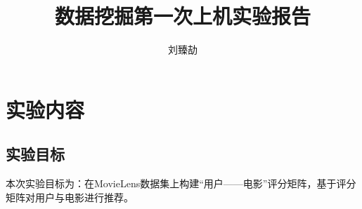 

\title{数据挖掘第一次上机实验报告}
\author{刘臻劼}


\clearpage
\tableofcontents
\pagestyle{preContent}

\clearpage
\section{实验内容}
\subsection{实验目标}
\xiaosi\begin{spacing}{1.5} 本次实验目标为：在MovieLens数据集上构建“用户——电影”评分矩阵，基于评分矩阵对用户与电影进行推荐。
\end{spacing}
